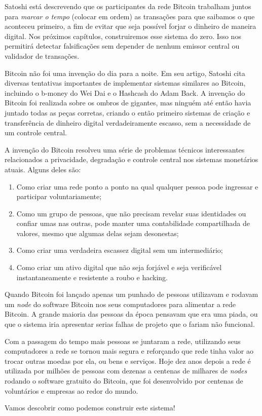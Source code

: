 Satoshi está descrevendo que os participantes da rede Bitcoin trabalham juntos para \textit{marcar o tempo} (colocar em ordem) as transações para que saibamos o que aconteceu primeiro, a fim de evitar que seja possível forjar o dinheiro de maneira digital. Nos próximos capítulos, construiremos esse sistema do zero. Isso nos permitirá detectar falsificações sem depender de nenhum emissor central ou validador de transações.

Bitcoin não foi uma invenção do dia para a noite. Em seu artigo, Satoshi cita diversas tentativas importantes de implementar sistemas similares ao Bitcoin, incluindo o b-money do Wei Dai e o Hashcash do Adam Back. A invenção do Bitcoin foi realizada sobre os ombros de gigantes, mas ninguém até então havia juntado todas as peças corretas, criando o então primeiro sistemas de criação e transferência de dinheiro digital verdadeiramente escasso, sem a necessidade de um controle central. 

A invenção do Bitcoin resolveu uma série de problemas técnicos interessantes relacionados a privacidade, degradação e controle central nos sistemas monetários atuais. Alguns deles são:

\begin{enumerate}
\item Como criar uma rede ponto a ponto na qual qualquer pessoa pode ingressar e participar voluntariamente;
\item Como um grupo de pessoas, que não precisam revelar suas identidades ou confiar umas nas outras, pode manter uma contabilidade compartilhada de valores, mesmo que algumas delas sejam desonestas;
\item Como criar uma verdadeira escassez digital sem um intermediário;
\item Como criar um ativo digital que não seja forjável e seja verificável instantaneamente e resistente a roubo e hacking.
\end{enumerate}

Quando Bitcoin foi lançado apenas um punhado de pessoas utilizavam e rodavam um \textit{node} do software Bitcoin nos seus computadores para alimentar a rede Bitcoin. A grande maioria das pessoas da época pensavam que era uma piada, ou que o sistema iria apresentar serias falhas de projeto que o fariam não funcional. 

Com a passagem do tempo mais pessoas se juntaram a rede, utilizando seus computadores a rede se tornou mais segura e reforçando que rede tinha valor ao trocar outras moedas por ela, ou bens e serviços. Hoje dez anos depois a rede é utilizada por milhões de pessoas com dezenas a centenas de milhares de \textit{nodes} rodando o software gratuito do Bitcoin, que foi desenvolvido por centenas de voluntários e empresas ao redor do mundo.

Vamos descobrir como podemos construir este sistema!
